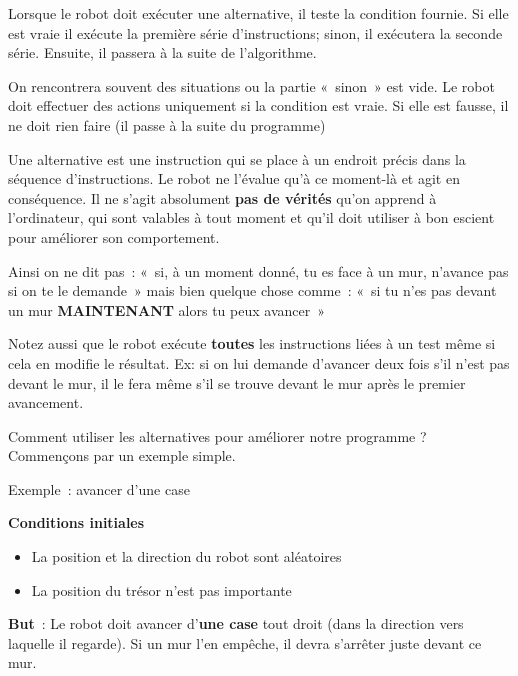 	Lorsque le robot doit exécuter une alternative, il teste la condition
	fournie. Si elle est vraie il exécute la première série
	d'instructions; sinon, il exécutera la seconde série.
	Ensuite, il passera à la suite de l'algorithme.

	On rencontrera souvent des situations ou la partie «~sinon~» est vide.
	Le robot doit effectuer des actions uniquement si la condition est
	vraie. Si elle est fausse, il ne doit rien faire (il passe à la suite
	du programme)

	Une alternative est une instruction qui se place à un endroit précis
	dans la séquence d'instructions. Le robot ne
	l'évalue qu'à ce moment-là et agit en
	conséquence. Il ne s'agit absolument \textbf{pas de
	vérités} qu'on apprend à
	l'ordinateur, qui sont valables à tout moment et
	qu'il doit utiliser à bon escient pour améliorer son
	comportement.

	Ainsi on ne dit pas~: «~si, à un moment donné, tu es face à un mur,
	n'avance pas si on te le demande~» mais bien quelque
	chose comme~: «~si tu n'es pas devant un mur
	\textbf{MAINTENANT} alors tu peux avancer~»

	Notez aussi que le robot exécute \textbf{toutes} les instructions liées
	à un test même si cela en modifie le résultat. Ex: si on lui demande
	d'avancer deux fois s'il
	n'est pas devant le mur, il le fera même
	s'il se trouve devant le mur après le premier
	avancement.

	Comment utiliser les alternatives pour améliorer notre programme ?
	Commençons par un exemple simple.

	
	\begin{Emphase}[exercice]{Exemple~: avancer d'une case}

		\textbf{Conditions initiales}

		\begin{itemize}
		\item La position et la direction du robot sont aléatoires
		\item La position du trésor n'est pas importante
		\end{itemize}
		
		\textbf{But}~: Le robot doit avancer d'\textbf{une
		case} tout droit (dans la direction vers laquelle il regarde). 
		Si un mur l'en empêche, il devra s'arrêter juste devant ce mur.

	\end{Emphase}

	
